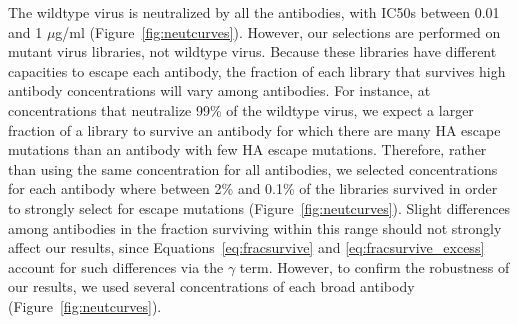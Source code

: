 \documentclass[11pt]{article}
\begin{document}
The wildtype virus is neutralized by all the antibodies, with IC50s between 0.01 and 1 $\mu$g/ml (Figure~\ref{fig:neutcurves}).
However, our selections are performed on mutant virus libraries, not wildtype virus.
Because these libraries have different capacities to escape each antibody, the fraction of each library that survives high antibody concentrations will vary among antibodies.
For instance, at concentrations that neutralize 99\% of the wildtype virus, we expect a larger fraction of a library to survive an antibody for which there are many HA escape mutations than an antibody with few HA escape mutations.
Therefore, rather than using the same concentration for all antibodies, we selected concentrations for each antibody where between 2\% and 0.1\% of the libraries survived in order to strongly select for escape mutations (Figure~\ref{fig:neutcurves}).
Slight differences among antibodies in the fraction surviving within this range should not strongly affect our results, since Equations~\ref{eq:fracsurvive} and \ref{eq:fracsurvive_excess} account for such differences via the $\gamma$ term.
However, to confirm the robustness of our results, we used several concentrations of each broad antibody (Figure~\ref{fig:neutcurves}).
\end{document}

